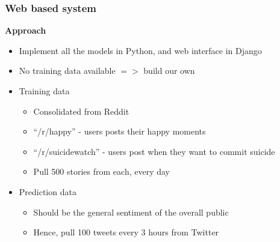 \documentclass{beamer}
\begin{document}
    \begin{frame}
        \frametitle{Web based system}
        \begin{center}
            \textbf{Approach}
        \end{center}
        \begin{itemize}
            \item{Implement all the models in Python, and web interface in Django}
            \item{No training data available $=>$ build our own}
            \item{
            Training data
            \begin{itemize}
                \item{Consolidated from Reddit}
                \item{``/r/happy'' - users posts their happy moments}
                \item{``/r/suicidewatch'' - users post when they want to commit suicide}
                \item{Pull 500 stories from each, every day}
            \end{itemize}
            }
            \item{
            Prediction data
            \begin{itemize}
                \item{Should be the general sentiment of the overall public}
                \item{Hence, pull 100 tweets every 3 hours from Twitter}
            \end{itemize}
            }
        \end{itemize}
    \end{frame}
    
\end{document}
